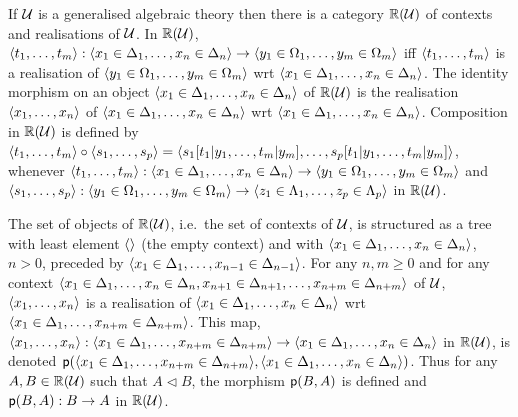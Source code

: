   If $\mathcal{U}$ is a generalised algebraic theory then there is a category $\mathbb{R}(\mathcal{U})$ of contexts and realisations of $\mathcal{U}$.
  In $\mathbb{R}(\mathcal{U})$, $\langle t_1, \dots, t_m \rangle : \langle x_1 \in \Delta_1, \dots, x_n \in \Delta_n \rangle \to \langle y_1 \in \Omega_1, \dots, y_m \in \Omega_m \rangle$ iff $\langle t_1, \dots, t_m \rangle$ is a realisation of $\langle y_1 \in \Omega_1, \dots, y_m \in \Omega_m \rangle$ wrt $\langle x_1 \in \Delta_1, \dots, x_n \in \Delta_n \rangle$.
  The identity morphism on an object $\langle x_1 \in \Delta_1, \dots, x_n \in \Delta_n \rangle$ of $\mathbb{R}(\mathcal{U})$ is the realisation $\langle x_1, \dots, x_n \rangle$ of $\langle x_1 \in \Delta_1, \dots, x_n \in \Delta_n \rangle$ wrt $\langle x_1 \in \Delta_1, \dots, x_n \in \Delta_n \rangle$.
  Composition in $\mathbb{R}(\mathcal{U})$ is defined by $\langle t_1, \dots, t_m \rangle \circ \langle s_1, \dots, s_p \rangle = \langle s_1[t_1|y_1, \dots, t_m|y_m], \dots, s_p[t_1|y_1, \dots, t_m|y_m] \rangle$, whenever $\langle t_1, \dots, t_m \rangle : \langle x_1 \in \Delta_1, \dots, x_n \in \Delta_n \rangle \to \langle y_1 \in \Omega_1, \dots, y_m \in \Omega_m \rangle$ and $\langle s_1, \dots, s_p \rangle : \langle y_1 \in \Omega_1, \dots, y_m \in \Omega_m \rangle \to \langle z_1 \in \Lambda_1, \dots, z_p \in \Lambda_p \rangle$ in $\mathbb{R}(\mathcal{U})$.

  The set of objects of $\mathbb{R}(\mathcal{U})$, i.e.\ the set of contexts of $\mathcal{U}$, is structured as a tree with least element $\langle  \rangle$ (the empty context) and with $\langle x_1 \in \Delta_1, \dots, x_n \in \Delta_n \rangle$, $n > 0$, preceded by $\langle x_1 \in \Delta_1, \dots, x_{n-1} \in \Delta_{n-1} \rangle$.
  For any $n,m \ge 0$ and for any context $\langle x_1 \in \Delta_1, \dots, x_n \in \Delta_n, x_{n+1} \in \Delta_{n+1}, \dots, x_{n+m} \in \Delta_{n+m} \rangle$ of $\mathcal{U}$, $\langle x_1, \dots, x_n \rangle$ is a realisation of $\langle x_1 \in \Delta_1, \dots, x_n \in \Delta_n \rangle$ wrt $\langle x_1 \in \Delta_1, \dots, x_{n+m} \in \Delta_{n+m} \rangle$.
  This map, $\langle x_1, \dots, x_n \rangle : \langle x_1 \in \Delta_1, \dots, x_{n+m} \in \Delta_{n+m} \rangle \to \langle x_1 \in \Delta_1, \dots, x_n \in \Delta_n \rangle$ in $\mathbb{R}(\mathcal{U})$, is denoted $\mathsf{p}(\langle x_1 \in \Delta_1, \dots, x_{n+m} \in \Delta_{n+m} \rangle, \langle x_1 \in \Delta_1, \dots, x_n \in \Delta_n \rangle)$.
  Thus for any $A, B \in \mathbb{R}(\mathcal{U})$ such that $A \triangleleft B$, the morphism $\mathsf{p}(B,A)$ is defined and $\mathsf{p}(B,A) : B \to A$ in $\mathbb{R}(\mathcal{U})$.

